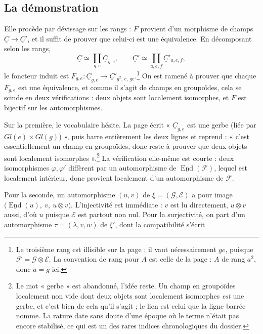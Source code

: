 \documentclass[11pt,a4paper]{article}
\begin{document}
\subsection*{La démonstration}

Elle procède par dévissage sur les rangs : $F$
provient d'un morphisme de champs $\underline{C} \to \underline{C}'$, et il
suffit de prouver que celui-ci est une équivalence. En décomposant selon les
rangs,
\[
\underline{C} \simeq \coprod_{g,e} \underline{C}_{g,e},
\qquad
\underline{C}' \simeq \coprod_{a,e,f} \underline{C}'_{a,e,f},
\]
le foncteur induit est $F_{g,e} : \underline{C}_{g,e} \to
\underline{C}'_{g^{2},\,e,\,ge}$.\footnote{Le troisième rang est illisible sur
la page ; il vaut nécessairement $ge$, puisque $\mathcal{F} = \mathcal{G}
\otimes \mathcal{E}$. La convention de rang pour $A$ est celle de la page :
$A$ de rang $a^{2}$, donc $a = g$ ici.} On est ramené à prouver que chaque
$F_{g,e}$ est une équivalence, et comme il s'agit de champs en groupoïdes,
cela se scinde en deux vérifications : deux objets sont localement isomorphes,
et $F$ est bijectif sur les automorphismes.

Sur la première, le vocabulaire hésite. La page écrit
« $\underline{C}_{g,e}$ est une gerbe (liée par $Gl(e) \times Gl(g)$) », puis
barre entièrement les deux lignes et reprend : « c'est essentiellement un champ
en groupoïdes, donc reste à prouver que deux objets sont localement
isomorphes ».\footnote{Le mot « gerbe » est abandonné, l'idée reste. Un
champ en groupoïdes localement non vide dont deux objets sont localement
isomorphes \emph{est} une gerbe, et c'est bien de cela qu'il s'agit ; le lien
est celui que la ligne barrée nomme. La rature date sans doute d'une époque où
le terme n'était pas encore stabilisé, ce qui est un des rares indices
chronologiques du dossier.} La vérification elle-même est courte : deux
isomorphismes $\varphi, \varphi'$ diffèrent par un automorphisme de
$\underline{\operatorname{End}}(\mathcal{F})$, lequel est localement intérieur,
donc provient localement d'un automorphisme de $\mathcal{F}$.

Pour la seconde, un automorphisme $(u,v)$ de $\xi = (\mathcal{G}, \mathcal{E})$
a pour image $\bigl(\underline{\operatorname{End}}(u),\ v,\ u \otimes v\bigr)$.
L'injectivité est immédiate : $v$ est lu directement, $u \otimes v$ aussi,
d'où $u$ puisque $\mathcal{E}$ est partout non nul. Pour la surjectivité, on
part d'un automorphisme $\tau = (\lambda, v, w)$ de $\xi'$, dont la
compatibilité s'écrit
\end{document}

